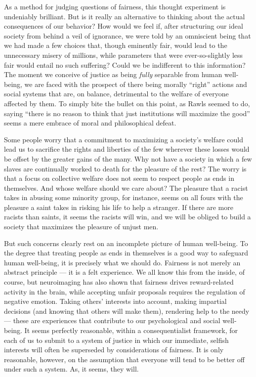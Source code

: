 \documentclass[a4paper,14pt]{extbook}
\begin{document}
As a method for judging questions of fairness, this thought experiment is undeniably brilliant.
But is it really an alternative to thinking about the actual consequences of our behavior?
How would we feel if, after structuring our ideal society from behind a veil of ignorance, we were told by an omniscient being that we had made a few choices that, though eminently fair, would lead to the unnecessary misery of millions, while parameters that were ever-so-slightly less fair would entail no such suffering?
Could we be indifferent to this information?
The moment we conceive of justice as being \textit{fully} separable from human well-being, we are faced with the prospect of there being morally ``right'' actions and social systems that are, on balance, detrimental to the welfare of everyone affected by them.
To simply bite the bullet on this point, as Rawls seemed to do, saying ``there is no reason to think that just institutions will maximize the good'' seems a mere embrace of moral and philosophical defeat.

Some people worry that a commitment to maximizing a society's welfare could lead us to sacrifice the rights and liberties of the few wherever these losses would be offset by the greater gains of the many.
Why not have a society in which a few slaves are continually worked to death for the pleasure of the rest?
The worry is that a focus on collective welfare does not seem to respect people as ends in themselves.
And whose welfare should we care about?
The pleasure that a racist takes in abusing some minority group, for instance, seems on all fours with the pleasure a saint takes in risking his life to help a stranger.
If there are more racists than saints, it seems the racists will win, and we will be obliged to build a society that maximizes the pleasure of unjust men.

But such concerns clearly rest on an incomplete picture of human well-being.
To the degree that treating people as ends in themselves is a good way to safeguard human well-being, it is precisely what we should do.
Fairness is not merely an abstract principle --- it is a felt experience.
We all know this from the inside, of course, but neuroimaging has also shown that fairness drives reward-related activity in the brain, while accepting unfair proposals requires the regulation of negative emotion.
Taking others' interests into account, making impartial decisions (and knowing that others will make them), rendering help to the needy --- these are experiences that contribute to our psychological and social well-being.
It seems perfectly reasonable, within a consequentialist framework, for each of us to submit to a system of justice in which our immediate, selfish interests will often be superseded by considerations of fairness.
It is only reasonable, however, on the assumption that everyone will tend to be better off under such a system.
As, it seems, they will.
\end{document}

